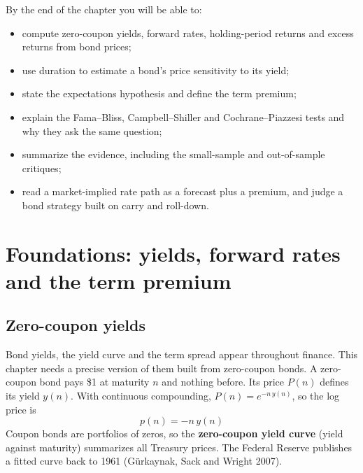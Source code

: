 By the end of the chapter you will be able to:

\begin{itemize}
  \item compute zero-coupon yields, forward rates, holding-period returns and excess returns from bond prices;
  \item use duration to estimate a bond's price sensitivity to its yield;
  \item state the expectations hypothesis and define the term premium;
  \item explain the Fama--Bliss, Campbell--Shiller and Cochrane--Piazzesi tests and why they ask the same question;
  \item summarize the evidence, including the small-sample and out-of-sample critiques;
  \item read a market-implied rate path as a forecast plus a premium, and judge a bond strategy built on carry and roll-down.
\end{itemize}

\section{Foundations: yields, forward rates and the term premium}
\label{sec:10-foundations}

\subsection{Zero-coupon yields}

Bond yields, the yield curve and the term spread appear throughout finance. This chapter needs a precise version of them built from zero-coupon bonds. A zero-coupon bond pays \$1 at maturity $n$ and nothing before. Its price $P(n)$ defines its yield $y(n)$. With continuous compounding, $P(n) = e^{-n\,y(n)}$, so the log price is
\begin{equation}
  p(n) = -n\,y(n)
  \label{eq:10-logprice}
\end{equation}
Coupon bonds are portfolios of zeros, so the \textbf{zero-coupon yield curve} (yield against maturity) summarizes all Treasury prices. The Federal Reserve publishes a fitted curve back to 1961 (G\"urkaynak, Sack and Wright 2007).

